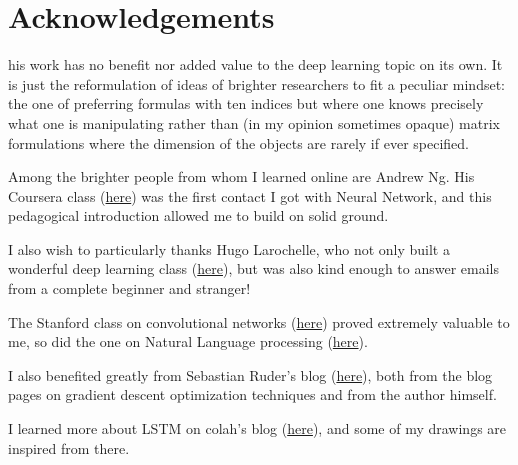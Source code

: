 \chapter{Acknowledgements}

his work has no benefit nor added value to the deep learning topic on its own. It is just the reformulation of ideas of brighter researchers to fit a peculiar mindset: the one of preferring formulas with ten indices but where one knows precisely what one is manipulating rather than (in my opinion sometimes opaque) matrix formulations where the dimension of the objects are rarely if ever specified. 

\vspace{0.2cm}

Among the brighter people from whom I learned online are Andrew Ng. His Coursera class (\href{https://www.coursera.org/learn/machine-learning}{here}) was the first contact I got with Neural Network, and this pedagogical introduction allowed me to build on solid ground. 

\vspace{0.2cm}

I also wish to particularly thanks Hugo Larochelle, who not only built a wonderful deep learning class (\href{http://info.usherbrooke.ca/hlarochelle/neural_networks/content.html}{here}), but was also kind enough to answer emails from a complete beginner and stranger!

\vspace{0.2cm}

The Stanford class on convolutional networks (\href{http://cs231n.github.io/convolutional-networks/}{here}) proved extremely valuable to me, so did the one on Natural Language processing (\href{http://web.stanford.edu/class/cs224n/}{here}). 

\vspace{0.2cm}

I also benefited greatly from Sebastian Ruder's blog (\href{http://ruder.io/#open}{here}), both from the blog pages on gradient descent optimization techniques and from the author himself. 

\vspace{0.2cm}

I learned more about LSTM on colah's blog (\href{http://colah.github.io/posts/2015-08-Understanding-LSTMs/}{here}), and some of my drawings are inspired from there.

\vspace{0.2cm}

